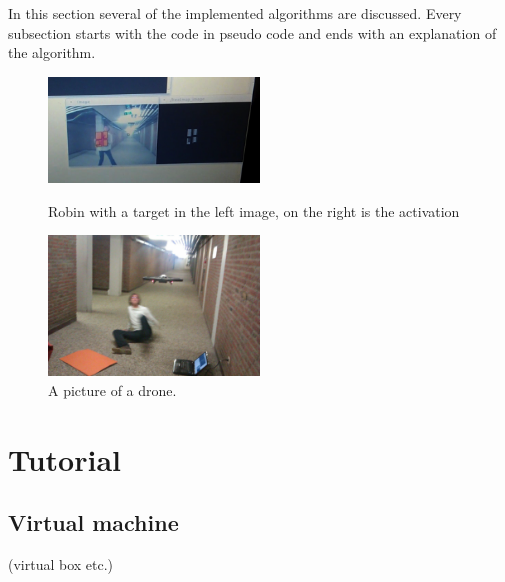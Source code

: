 \documentclass[a4paper,10pt]{article}
\begin{document}
In this section several of the implemented algorithms are discussed. Every subsection starts with the code in pseudo code and ends with an explanation of the algorithm. 

\begin{figure}[h!]
	\caption{Robin with a target in the left image, on the right is the activation}
	\centering
	\includegraphics[width=0.5\textwidth]{images/robinPresentActivation}
	\label{fig:robinPresentActivation}
\end{figure}

\begin{figure}[h!]
	\caption{A picture of a drone.}
	\centering
	\includegraphics[width=0.5\textwidth]{images/droneAttack}
\end{figure}

\section{Tutorial}
\subsection{Virtual machine}
(virtual box etc.)
\end{document}
